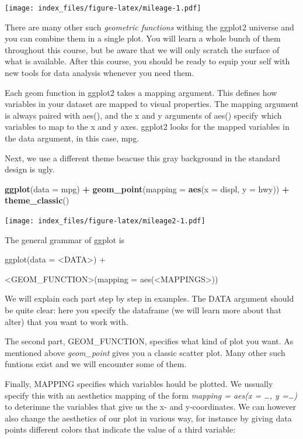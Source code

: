 \documentclass[]{article}
\newenvironment{Shaded}{\begin{snugshade}}{\end{snugshade}}
\newcommand{\DataTypeTok}[1]{\textcolor[rgb]{0.13,0.29,0.53}{#1}}
\newcommand{\KeywordTok}[1]{\textcolor[rgb]{0.13,0.29,0.53}{\textbf{#1}}}
\newcommand{\NormalTok}[1]{#1}
\newcommand{\OperatorTok}[1]{\textcolor[rgb]{0.81,0.36,0.00}{\textbf{#1}}}
\newcommand{\StringTok}[1]{\textcolor[rgb]{0.31,0.60,0.02}{#1}}
\begin{document}
\texttt{[image: index\_files/figure-latex/mileage-1.pdf]}

There are many other such \emph{geometric functions} withing the ggplot2
universe and you can combine them in a single plot. You will learn a
whole bunch of them throughout this course, but be aware that we will
only scratch the surface of what is available. After this course, you
should be ready to equip your self with new tools for data analysis
whenever you need them.

Each geom function in ggplot2 takes a mapping argument. This defines how
variables in your dataset are mapped to visual properties. The mapping
argument is always paired with aes(), and the x and y arguments of aes()
specify which variables to map to the x and y axes. ggplot2 looks for
the mapped variables in the data argument, in this case, mpg.

Next, we use a different theme beacuse this gray background in the
standard design is ugly.

\begin{Shaded}
\begin{Highlighting}[]
\KeywordTok{ggplot}\NormalTok{(}\DataTypeTok{data =}\NormalTok{ mpg) }\OperatorTok{+}\StringTok{ }
\StringTok{  }\KeywordTok{geom_point}\NormalTok{(}\DataTypeTok{mapping =} \KeywordTok{aes}\NormalTok{(}\DataTypeTok{x =}\NormalTok{ displ, }\DataTypeTok{y =}\NormalTok{ hwy)) }\OperatorTok{+}
\StringTok{  }\KeywordTok{theme_classic}\NormalTok{()}
\end{Highlighting}
\end{Shaded}

\texttt{[image: index\_files/figure-latex/mileage2-1.pdf]}

The general grammar of ggplot is

ggplot(data = \textless{}DATA\textgreater{}) +

\textless{}GEOM\_FUNCTION\textgreater{}(mapping =
aes(\textless{}MAPPINGS\textgreater{}))

We will explain each part step by step in examples. The DATA argument
should be quite clear: here you specify the dataframe (we will learn
more about that alter) that you want to work with.

The second part, GEOM\_FUNCTION, specifies what kind of plot you want.
As mentioned above \emph{geom\_point} gives you a classic scatter plot.
Many other such funtions exist and we will encounter some of them.

Finally, MAPPING specifies which variables hould be plotted. We ussually
specify this with an aesthetics mapping of the form \emph{mapping =
aes(x = \ldots{}, y =\ldots{})} to deterimne the variables that give us
the x- and y-coordinates. We can however also change the aesthetics of
our plot in various way, for instance by giving data points different
colors that indicate the value of a third variable:
\end{document}
